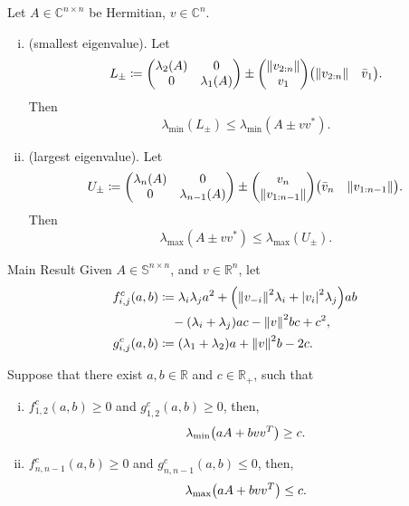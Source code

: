 \documentclass[]{beamer}
\theoremstyle{plain}
\theoremstyle{definition}
\theoremstyle{remark}
\newcommand{\MB}[1]{\mathbb{#1}}
\newcommand{\lmin}{\lambda_{\min}}
\newcommand{\lmax}{\lambda_{\max}}
\begin{document}
\begin{frame}
	\begin{theorem}
		\label{thm:ipsen}
		Let $A \in \MB{C}^{n \times n}$ be Hermitian, $v \in \MB{C}^n$.
		\begin{enumerate}[(i)]
			\item<+-> (smallest eigenvalue). Let
				\begin{equation*}
					L_{\pm} \coloneqq \mqty(\lambda_2(A) & 0 \\ 0 & \lambda_1(A)) \pm
					\mqty(\norm{v_{2:n}} \\ v_1) \mqty(\norm{v_{2:n}} & \bar{v}_1).
				\end{equation*}
				Then
				\begin{equation*}
					\lmin(L_{\pm}) \le \lmin(A \pm v v^\ast).
				\end{equation*}
			\item<+-> (largest eigenvalue). Let
				\begin{equation*}
					U_{\pm} \coloneqq \mqty(\lambda_n(A) & 0 \\ 0 & \lambda_{n-1}(A)) \pm
					\mqty(v_n \\ \norm{v_{1:n-1}}) \mqty(\bar{v}_n & \norm{v_{1:n-1}}).
				\end{equation*}
				Then
				\begin{equation*}
					\lmax(A \pm v v^\ast) \le \lmax(U_{\pm}).
				\end{equation*}
		\end{enumerate}
	\end{theorem}
\end{frame}

\begin{frame}{Main Result}
	Given $A \in \MB{S}^{n \times n}$, and $v \in \MB{R}^n$, let 
	\begin{align*}
		f_{i,j}^c(a, b) &\coloneqq \lambda_i \lambda_j a^2 + \qty(\norm{v_{-i}}^2
		\lambda_i + \abs{v_i}^2 \lambda_j) a b \\
		&\quad - \qty(\lambda_i + \lambda_j) a c - \norm{v}^2 b c + c^2,\\
		g_{i,j}^c(a, b) &\coloneqq \qty(\lambda_1 + \lambda_2) a + \norm{v}^2 b -
		2 c.
	\end{align*}
	\pause

	\begin{theorem}
		Suppose that there exist $a, b \in \MB{R}$ and $c \in \MB{R}_{+}$, such
		that 
		\begin{enumerate}[(i)]
			\item $f_{1, 2}^c(a,b) \ge 0$ and $g_{1, 2}^c(a,b) \ge 0$, then,
				\begin{equation*}
					\lambda_{\min} \qty(a A + b v v^T) \ge c.
				\end{equation*}
			\item $f_{n, n-1}^c(a,b) \ge 0$ and $g_{n, n-1}^c(a,b) \le 0$, then,
				\begin{equation*}
					\lambda_{\max} \qty(a A + b v v^T) \le c.
				\end{equation*}
		\end{enumerate}
	\end{theorem}
\end{frame}
\end{document}
